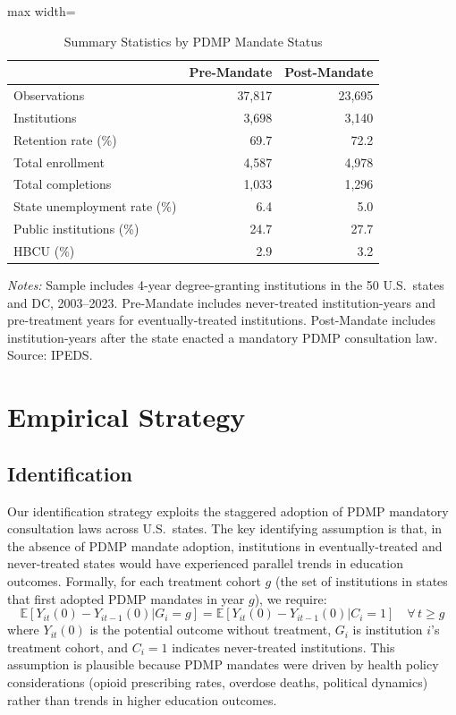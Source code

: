 \documentclass[12pt]{article}
\newcommand{\E}{\mathbb{E}}
\begin{document}
\begin{table}[htbp]
\centering
\caption{Summary Statistics by PDMP Mandate Status}
\label{tab:summary}
\begin{threeparttable}
\begin{adjustbox}{max width=\textwidth}
\begin{tabular}{lrr}
\toprule
 & Pre-Mandate & Post-Mandate \\
\midrule
Observations & 37,817 & 23,695 \\
Institutions & 3,698 & 3,140 \\
Retention rate (\%) & 69.7 & 72.2 \\
Total enrollment & 4,587 & 4,978 \\
Total completions & 1,033 & 1,296 \\
State unemployment rate (\%) & 6.4 & 5.0 \\
Public institutions (\%) & 24.7 & 27.7 \\
HBCU (\%) & 2.9 & 3.2 \\
\bottomrule
\end{tabular}
\end{adjustbox}
\begin{tablenotes}
\small
\item \textit{Notes:} Sample includes 4-year degree-granting institutions in the 50 U.S.\ states and DC, 2003--2023. Pre-Mandate includes never-treated institution-years and pre-treatment years for eventually-treated institutions. Post-Mandate includes institution-years after the state enacted a mandatory PDMP consultation law. Source: IPEDS.
\end{tablenotes}
\end{threeparttable}
\end{table}


\section{Empirical Strategy}

\subsection{Identification}

Our identification strategy exploits the staggered adoption of PDMP mandatory consultation laws across U.S.\ states. The key identifying assumption is that, in the absence of PDMP mandate adoption, institutions in eventually-treated and never-treated states would have experienced parallel trends in education outcomes. Formally, for each treatment cohort $g$ (the set of institutions in states that first adopted PDMP mandates in year $g$), we require:
\begin{equation}
\E[Y_{it}(0) - Y_{it-1}(0) | G_i = g] = \E[Y_{it}(0) - Y_{it-1}(0) | C_i = 1] \quad \forall\, t \geq g
\end{equation}
where $Y_{it}(0)$ is the potential outcome without treatment, $G_i$ is institution $i$'s treatment cohort, and $C_i = 1$ indicates never-treated institutions. This assumption is plausible because PDMP mandates were driven by health policy considerations (opioid prescribing rates, overdose deaths, political dynamics) rather than trends in higher education outcomes.
\end{document}
